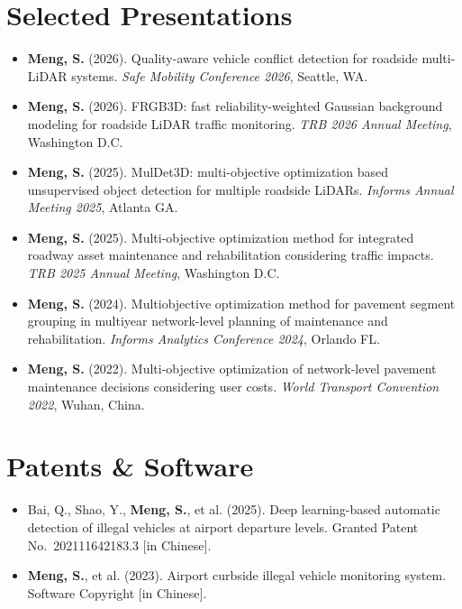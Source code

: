 \documentclass[11pt,a4paper]{article}
\begin{document}
\section*{Selected Presentations}
\begin{itemize}[leftmargin=1.2em]
    \item \textbf{Meng, S.} (2026). Quality-aware vehicle conflict detection for roadside multi-LiDAR systems. \textit{Safe Mobility Conference 2026}, Seattle, WA.
    \item \textbf{Meng, S.} (2026). FRGB3D: fast reliability-weighted Gaussian background modeling for roadside LiDAR traffic monitoring. \textit{TRB 2026 Annual Meeting}, Washington D.C.
    \item \textbf{Meng, S.} (2025). MulDet3D: multi-objective optimization based unsupervised object detection for multiple roadside LiDARs. \textit{Informs Annual Meeting 2025}, Atlanta GA.
    \item \textbf{Meng, S.} (2025). Multi-objective optimization method for integrated roadway asset maintenance and rehabilitation considering traffic impacts. \textit{TRB 2025 Annual Meeting}, Washington D.C.
    \item \textbf{Meng, S.} (2024). Multiobjective optimization method for pavement segment grouping in multiyear network-level planning of maintenance and rehabilitation. \textit{Informs Analytics Conference 2024}, Orlando FL.
    \item \textbf{Meng, S.} (2022). Multi-objective optimization of network-level pavement maintenance decisions considering user costs. \textit{World Transport Convention 2022}, Wuhan, China.
\end{itemize}

\section*{Patents \& Software}
\begin{itemize}[leftmargin=1.2em]
    \item Bai, Q., Shao, Y., \textbf{Meng, S.}, et al. (2025). Deep learning-based automatic detection of illegal vehicles at airport departure levels. Granted Patent No.\ 202111642183.3 [in Chinese].
    \item \textbf{Meng, S.}, et al. (2023). Airport curbside illegal vehicle monitoring system. Software Copyright [in Chinese].
\end{itemize}
\end{document}

